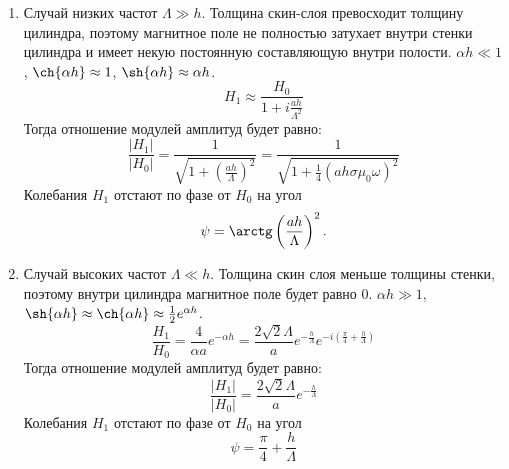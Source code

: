 \begin{enumerate}
	\item Случай низких частот $\Lambda \gg h$. Толщина скин-слоя превосходит толщину цилиндра, поэтому магнитное поле не полностью затухает внутри стенки цилиндра и имеет некую постоянную составляющую внутри полости. $\alpha h \ll 1$, $\ch{\alpha h} \approx 1$, $\sh{\alpha h} \approx \alpha h$.
	$$
	H_1 \approx \frac{H_0}{1 + i \frac{ah}{\Lambda^2}}
	$$
	Тогда отношение модулей амплитуд будет равно:
	\begin{equation}
		\frac{|H_1|}{|H_0|} = \frac{1}{\sqrt{1 + \left( \frac{ah}{\Lambda} \right)^2}} = \frac{1}{\sqrt{1 + \frac{1}{4} \left( a h \sigma \mu_0 \omega \right)^2}}
		\label{eq:low_ampl}
	\end{equation}
	Колебания $H_1$ отстают по фазе от $H_0$ на угол 
	\begin{equation}
		\psi = \arctg \left( \frac{ah}{\Lambda} \right)^2.
		\label{eq:low_phase}
	\end{equation}

	\item Случай высоких частот $\Lambda \ll h$. Толщина скин слоя меньше толщины стенки, поэтому внутри цилиндра магнитное поле будет равно 0. $\alpha h \gg 1$, $\sh{\alpha h} \approx \ch{\alpha h} \approx \frac{1}{2} e^{\alpha h}$.
	$$
	\frac{H_1}{H_0} = \frac{4}{\alpha a} e^{- \alpha h} = \frac{2\sqrt{2}\Lambda}{a} e^{-\frac{h}{\Lambda}} e^{-i \left( \frac{\pi}{4} + \frac{h}{\Lambda}\right)}
	$$
	Тогда отношение модулей амплитуд будет равно:
	\begin{equation}
		\frac{|H_1|}{|H_0|} = \frac{2\sqrt{2}\Lambda}{a} e^{-\frac{h}{\Lambda}}
		\label{eq:high_ampl}
	\end{equation}
	Колебания $H_1$ отстают по фазе от $H_0$ на угол 
	\begin{equation}
		\psi = \frac{\pi}{4} + \frac{h}{\Lambda}
		\label{eq:high_phase}
	\end{equation}
\end{enumerate}

